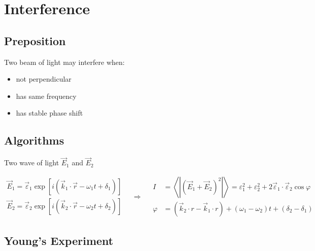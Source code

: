 \chapter{Interference}

\section{Preposition}

Two beam of light may interfere when:

\begin{itemize}
\item not perpendicular
\item has same frequency
\item has stable phase shift
\end{itemize}

\section{Algorithms}

Two wave of light $\vec{E}_1$ and $\vec{E}_2$

\begin{equation*}
  \begin{aligned}
    \vec{E}_1 = \vec{\varepsilon}_1 \exp \left[ i \left( \vec{k}_1 \cdot \vec{r} - \omega_1 t + \delta_1 \right) \right] \\
    \vec{E}_2 = \vec{\varepsilon}_2 \exp \left[ i \left( \vec{k}_2 \cdot \vec{r} - \omega_2 t + \delta_2 \right) \right]
  \end{aligned}
  \quad \Rightarrow \quad 
  \begin{aligned}
    I &= \left< \left| \left( \vec{E}_1 + \vec{E}_2 \right)^2 \right| \right> = \varepsilon_1^2 + \varepsilon_2^2 + 2 \vec{\varepsilon}_1 \cdot \vec{\varepsilon}_2 \cos \varphi \\
    \varphi &= \left( \vec{k}_2 \cdot r - \vec{k}_1 \cdot r \right) + \left( \omega_1 - \omega_2 \right) t + \left( \delta_2 - \delta_1 \right)
  \end{aligned}
\end{equation*}




\section{Young's Experiment}

